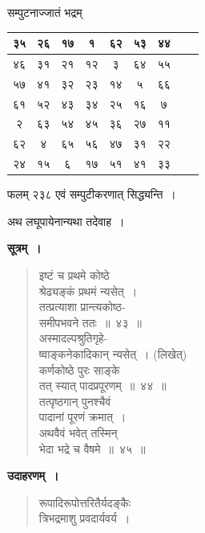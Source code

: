 \documentclass[11pt, openany]{book}
\begin{document}
\begin{center}
सम्पुटनाज्जातं भद्रम्
\vspace{3mm}

\begin{tabular}{|c|c|c|c|c|c|c|c|c|}
	\hline
	३५ & २६ & १७  & १ & ६२ & ५३ & ४४ \\
	\hline
	४६& ३१ & २१ & १२ & ३ & ६४ & ५५ \\
	\hline
	५७  & ४१ & ३२ & २३ & १४ & ५ & ६६  \\
	\hline 
	६१ & ५२ & ४३ & ३४ & २५ & १६ & ७   \\
	\hline
	२ & ६३ & ५४ & ४५ & ३६ & २७ & ११ \\
	\hline
	६२ & ४ & ६५ & ५६ & ४७ & ३१ & २२\\
	\hline
	२४ & १५ & ६ & १७ & ५१ & ४१ & ३३ \\
	\hline
\end{tabular}
\end{center}

फलम् २३८ एवं सम्पुटीकरणात् सिद्ध्यन्ति~।

\newpage

\begin{center}
अथ लघूपायेनान्यथा तदेवाह~।
\end{center}

\textbf{सूत्रम्~।}

\begin{quote}
{\gk इष्टं च प्रथमे कोष्ठे\\
श्रेढ्यङ्कं प्रथमं न्यसेत्~।\\
तत्प्रत्याशा प्रान्त्यकोष्ठ-\\
समीपभवने ततः~॥~४३~॥\\
अस्मादल्पश्रुतिगृहे-\\
ष्वाङ्कनेकादिकान् न्यसेत्~। (लिखेत्)\\
कर्णकोष्ठे पुरः साङ्के\\
तत् स्यात् पादप्रपूरणम्~॥~४४~॥\\
तत्पृष्ठगान् पुनश्चैवं\\
पादानां पूरणं क्रमात्~।\\
अथवैवं भवेत् तस्मिन्\\
भेदा भद्रे च वैषमे~॥~४५~॥}
\end{quote}

\textbf{उदाहरणम्~।}
\begin{quote}
{\ex रूपादिरूपोत्तरितैर्यदङ्कैः\\
त्रिभद्रमाशु प्रवदार्यवर्य~।}
\end{quote}

\newpage
\end{document}

